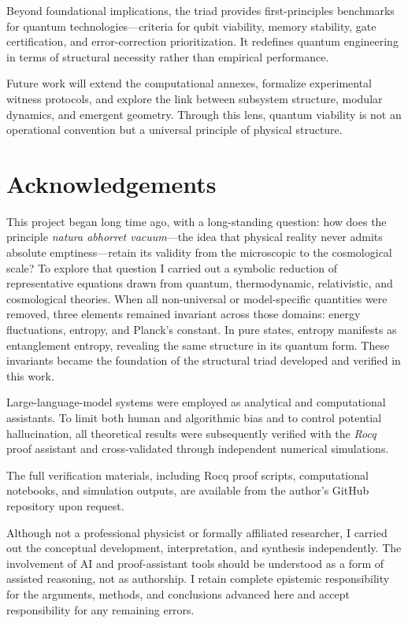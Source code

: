 \documentclass[10pt]{article}
\begin{document}
Beyond foundational implications, the triad provides first-principles benchmarks for quantum technologies—criteria for qubit viability, memory stability, gate certification, and error-correction prioritization. It redefines quantum engineering in terms of structural necessity rather than empirical performance.


Future work will extend the computational annexes, formalize experimental witness protocols, and explore the link between subsystem structure, modular dynamics, and emergent geometry. Through this lens, quantum viability is not an operational convention but a universal principle of physical structure.


\section*{Acknowledgements} 

This project began long time ago, with a long-standing question: how does the principle \textit{natura abhorret vacuum}—the idea that physical reality never admits absolute emptiness—retain its validity from the microscopic to the cosmological scale?
To explore that question I carried out a symbolic reduction of representative equations drawn from quantum, thermodynamic, relativistic, and cosmological theories.
When all non-universal or model-specific quantities were removed, three elements remained invariant across those domains: energy fluctuations, entropy, and Planck’s constant.
In pure states, entropy manifests as entanglement entropy, revealing the same structure in its quantum form.
These invariants became the foundation of the structural triad developed and verified in this work.

Large-language-model systems were employed as analytical and computational assistants. To limit both human and algorithmic bias and to control potential hallucination, all theoretical results were subsequently verified with the \emph{Rocq} proof assistant and cross-validated through independent numerical simulations. 

The full verification materials, including Rocq proof scripts, computational notebooks, and simulation outputs, are available from the author’s GitHub repository upon request. 

Although not a professional physicist or formally affiliated researcher, I carried out the conceptual development, interpretation, and synthesis independently. The involvement of AI and proof-assistant tools should be understood as a form of assisted reasoning, not as authorship. I retain complete epistemic responsibility for the arguments, methods, and conclusions advanced here and accept responsibility for any remaining errors.
\end{document}
